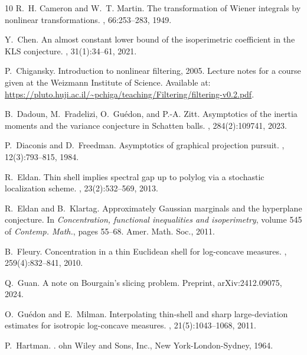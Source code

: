 \documentclass[12pt,a4paper]{article}
\theoremstyle{definition}
\begin{document}
\begin{thebibliography}{10}
R.~H. Cameron and W.~T. Martin.
\newblock The transformation of {Wiener} integrals by nonlinear
  transformations.
, 66:253--283, 1949.

Y.~Chen.
\newblock An almost constant lower bound of the isoperimetric coefficient in
  the {KLS} conjecture.
, 31(1):34--61, 2021.

P.~Chigansky.
\newblock Introduction to nonlinear filtering, 2005.
\newblock Lecture notes for a course given at the Weizmann Institute of
  Science. Available at:
  \url{https://pluto.huji.ac.il/~pchiga/teaching/Filtering/filtering-v0.2.pdf}.

B.~Dadoun, M.~Fradelizi, O.~Gu\'edon, and P.-A. Zitt.
\newblock Asymptotics of the inertia moments and the variance conjecture in
  {S}chatten balls.
, 284(2):109741, 2023.

P.~Diaconis and D.~Freedman.
\newblock Asymptotics of graphical projection pursuit.
, 12(3):793--815, 1984.

R.~Eldan.
\newblock Thin shell implies spectral gap up to polylog via a stochastic
  localization scheme.
, 23(2):532--569, 2013.

R.~Eldan and B.~Klartag.
\newblock Approximately {G}aussian marginals and the hyperplane conjecture.
\newblock In {\em Concentration, functional inequalities and isoperimetry},
  volume 545 of {\em Contemp. Math.}, pages 55--68. Amer. Math. Soc., 2011.

B.~Fleury.
\newblock Concentration in a thin {E}uclidean shell for log-concave measures.
, 259(4):832--841, 2010.

Q.~Guan.
\newblock A note on {Bourgain}'s slicing problem.
\newblock Preprint, {arXiv}:2412.09075, 2024.

O.~Gu\'edon and E.~Milman.
\newblock Interpolating thin-shell and sharp large-deviation estimates for
  isotropic log-concave measures.
, 21(5):1043--1068, 2011.

P.~Hartman.
.
ohn {W}iley and {S}ons, {Inc.}, {New {York}-{London}-{Sydney}},
  1964.


\end{thebibliography}
\end{document}
